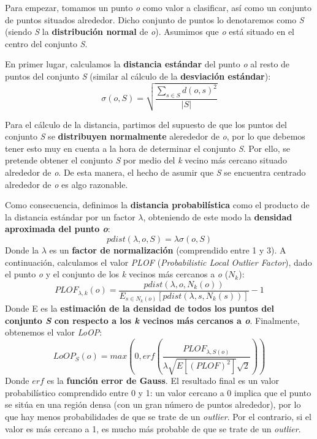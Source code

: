 \documentclass [a4paper] {article}
\begin{document}
Para empezar, tomamos un punto \textit{o} como valor a clasificar, así como un conjunto de puntos situados alrededor. Dicho conjunto de puntos lo denotaremos como \textit{S} (siendo \textit{S} la \textbf{distribución normal} de \textit{o}). Asumimos que \textit{o} está situado en el centro del conjunto \textit{S}.


En primer lugar, calculamos la \textbf{distancia estándar} del punto \textit{o} al resto de puntos del conjunto \textit{S} (similar al cálculo de la \textbf{desviación estándar}):
\begin{equation*}
\sigma(o,S) = \sqrt{\frac{\sum_{s \in S}{d(o,s)^2}}{|S|}}
\end{equation*}

Para el cálculo de la distancia, partimos del supuesto de que los puntos del conjunto \textit{S} se \textbf{distribuyen normalmente} alerededor de \textit{o}, por lo que debemos tener esto muy en cuenta a la hora de determinar el conjunto \textit{S}. Por ello, se pretende obtener el conjunto \textit{S} por medio del \textit{k} vecino más cercano situado alrededor de \textit{o}. De esta manera, el hecho de asumir que \textit{S} se encuentra centrado alrededor de \textit{o} es algo razonable.

Como consecuencia, definimos la \textbf{distancia probabilística} como el producto de la distancia estándar por un factor $\lambda$, obteniendo de este modo la \textbf{densidad aproximada del punto \textit{o}}:
\begin{equation*}
pdist(\lambda,o,S) = \lambda \sigma(o,S)
\end{equation*}
Donde la $\lambda$ es un \textbf{factor de normalización} (comprendido entre 1 y 3).
A continuación, calculamos el valor \textit{PLOF} (\textit{Probabilistic Local Outlier Factor}), dado el punto \textit{o} y el conjunto de los \textit{k} vecinos más cercanos a \textit{o} ($N_{k}$):
\begin{equation*}
PLOF_{\lambda,k}(o) = \frac{pdist(\lambda,o,N_{k}(o))}{E_{s \in N_{k}(o)}[pdist(\lambda,s,N_{k}(s))]} - 1
\end{equation*}
Donde E es la \textbf{estimación de la densidad de todos los puntos del conjunto \textit{S} con respecto a los \textit{k} vecinos más cercanos a \textit{o}}.
Finalmente, obtenemos el valor \textit{LoOP}:
\begin{equation*}
LoOP_{S}(o) = max(0,erf(\frac{PLOF_{\lambda,S(o)}}{\lambda \sqrt{E[(PLOF)^2]} \sqrt{2}}))
\end{equation*}
Donde $erf$ es la \textbf{función error de Gauss}. El resultado final es un valor probabilístico comprendido entre 0 y 1: un valor cercano a 0 implica que el punto se sitúa en una región densa (con un gran número de puntos alrededor), por lo que hay menos probabilidades de que se trate de un \textit{outlier}. Por el contrario, si el valor es más cercano a 1, es mucho más probable de que se trate de un \textit{outlier}.
\end{document}
